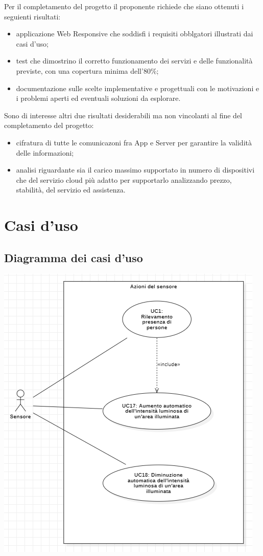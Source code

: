 \documentclass[a4paper, 12pt]{article}
\begin{document}
Per il completamento del progetto il proponente richiede che siano ottenuti i
seguienti risultati:
\begin{itemize}
    \item applicazione Web Responsive che soddisfi i requisiti obblgatori
    illustrati dai casi d'uso;
    \item test che dimostrino il corretto funzionamento dei servizi e delle
    funzionalità previste, con una copertura minima dell'80\%;
    \item documentazione sulle scelte implementative e progettuali con le
    motivazioni e i problemi aperti ed eventuali soluzioni da esplorare.
\end{itemize}
Sono di interesse altri due risultati desiderabili ma non vincolanti al fine del
completamento del progetto:
\begin{itemize}
    \item cifratura di tutte le comunicazoni fra App e Server per garantire la
    validità delle informazioni;
    \item analisi riguardante sia il carico massimo supportato in numero di
    dispositivi che del servizio cloud più adatto per supportarlo
    analizzando prezzo, stabilità, del servizio ed assistenza.
\end{itemize} 
\newpage
\section{Casi d'uso}

\subsection{Diagramma dei casi d'uso}

\includegraphics[scale=0.7]{diagramma_use_case_1.png}
\end{document}

